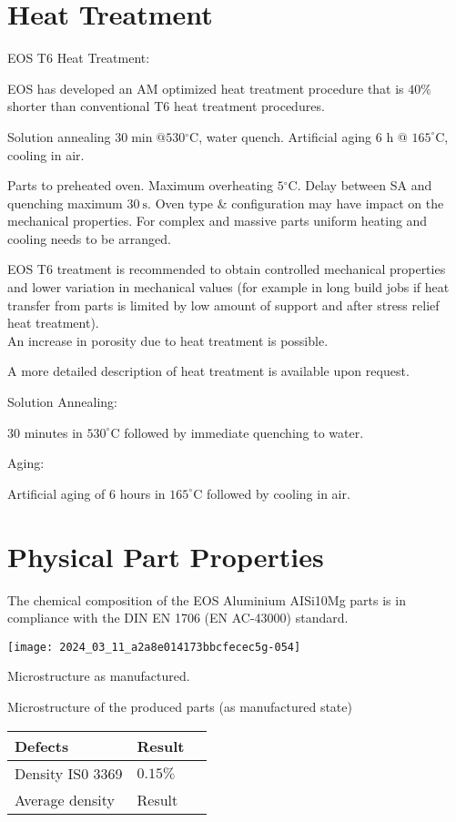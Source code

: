 \documentclass[10pt]{article}
\begin{document}
\section*{Heat Treatment}
EOS T6 Heat Treatment:

EOS has developed an AM optimized heat treatment procedure that is $40 \%$ shorter than conventional T6 heat treatment procedures.

Solution annealing $30 \min @ 530{ }^{\circ} \mathrm{C}$, water quench. Artificial aging 6 h @ $165^{\circ} \mathrm{C}$, cooling in air.

Parts to preheated oven. Maximum overheating $5{ }^{\circ} \mathrm{C}$. Delay between SA and quenching maximum $30 \mathrm{~s}$. Oven type \& configuration may have impact on the mechanical properties. For complex and massive parts uniform heating and cooling needs to be arranged.

EOS T6 treatment is recommended to obtain controlled mechanical properties and lower variation in mechanical values (for example in long build jobs if heat transfer from parts is limited by low amount of support and after stress relief heat treatment).\\
An increase in porosity due to heat treatment is possible.

A more detailed description of heat treatment is available upon request.

Solution Annealing:

30 minutes in $530^{\circ} \mathrm{C}$ followed by immediate quenching to water.

Aging:

Artificial aging of 6 hours in $165^{\circ} \mathrm{C}$ followed by cooling in air.

\section*{Physical Part Properties}
The chemical composition of the EOS Aluminium AISi10Mg parts is in compliance with the DIN EN 1706 (EN AC-43000) standard.

\begin{center}
\texttt{[image: 2024\_03\_11\_a2a8e014173bbcfecec5g-054]}
\end{center}

Microstructure as manufactured.

Microstructure of the produced parts (as manufactured state)

\begin{center}
\begin{tabular}{llc}
\hline
Defects & Result \\
\hline
Density IS0 3369 & $0.15 \%$ \\
Average density & Result \\
\hline
\end{tabular}
\end{center}
\end{document}
